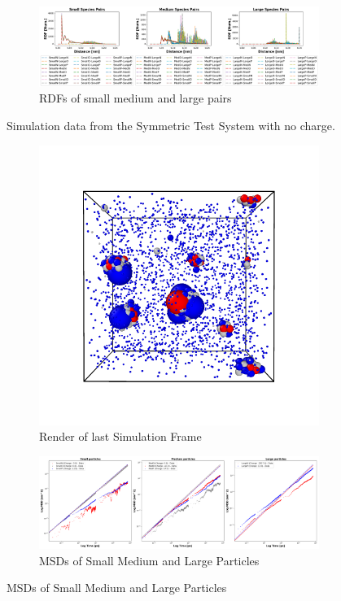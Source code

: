 \documentclass[draft, english]{volcanica-template}
\begin{document}
\begin{figure}[!htbp]
\begin{figure}[!htbp]
\centering
\includegraphics[width=0.7\linewidth]{files/Pairwise_RDFs_ij-496e4cab678e5269ed659c08237e9dd0.png}
\caption[]{RDFs of small medium and large pairs}
\label{Fig5_NoQSymTestSys-d}
\end{figure}
\caption[]{Simulation data from the Symmetric Test System with no charge.}
\label{Fig5_NoQSymTestSys-d}
\end{figure}

\begin{figure}[!htbp]
\centering
\begin{figure}[!htbp]
\centering
\includegraphics[width=0.7\linewidth]{files/LastRender-724ad6f5113736c16b46feb4f89aad8d.png}
\caption[]{Render of last Simulation Frame}
\label{Fig6}
\end{figure}

\begin{figure}[!htbp]
\centering
\includegraphics[width=0.7\linewidth]{files/Combined_MSD-804edbab2e86e80aaa8f2986f74f0ffe.png}
\caption[]{MSDs of Small Medium and Large Particles}
\label{Fig6_TestSys-b}
\end{figure}


\end{figure}
\end{document}
